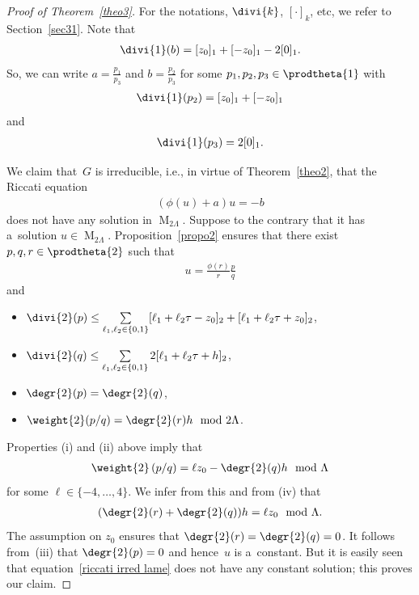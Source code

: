 \documentclass[pdftex]{sigma}
\numberwithin{equation}{section}
\begin{document}
\begin{proof}[Proof of Theorem~\ref{theo3}] For the notations, $\divi{k}$, $[\cdot]_k$, etc, we refer to Section~\ref{sec31}.
Note that
\begin{gather*}
\divi{1} (b)=[z_{0}]_{1}+[-z_{0}]_{1}-2[0]_{1}.
\end{gather*}
So, we can write $a=\frac{p_{1}}{p_{3}}$ and $b=\frac{p_{2}}{p_{3}}$ for some $p_{1},p_{2},p_{3}\in \prodtheta{1}$ with
\begin{gather*}
\divi{1} (p_{2})=[z_{0}]_{1}+[-z_{0}]_{1}
\end{gather*}
and
\begin{gather*}
\divi{1} (p_{3})=2[0]_{1}.
\end{gather*}

We claim that~$G$ is irreducible, i.e., in virtue of Theorem~\ref{theo2}, that the Riccati equation
\begin{gather}
\label{riccati irred lame}
(\phi(u)+a)u=-b
\end{gather}
does not have any solution in $\operatorname{M}_{2\Lambda}$.
Suppose to the contrary that it has a~solution $u \in \operatorname{M}_{2\Lambda}$.
Proposition~\ref{propo2} ensures that there exist $p,q, r\in \prodtheta{2}$ such that
\begin{gather*}
u= \frac{\phi(r)}{r}\frac{p}{q}
\end{gather*}
and
\begin{itemize}
\itemsep=0pt
\item[(i)] $\divi{2} (p) \leq \sum\limits_{\ell_{1},\ell_{2} \in
\{0,1\}}[\ell_{1}+\ell_{2}\tau-z_{0}]_{2}+[\ell_{1}+\ell_{2}\tau+z_{0}]_{2}$,
\item[(ii)] $\divi{2} (q) \leq \sum\limits_{\ell_{1},\ell_{2} \in \{0,1\}}2[\ell_{1}+\ell_{2}\tau+h]_{2}$,
\item[(iii)] $\degr{2} (p)=\degr{2} (q)$,
\item[(iv)] $\weight{2} (p/q)=\degr{2} (r) h \mod 2\Lambda$.
\end{itemize}
Properties (i) and (ii) above imply that
\begin{gather*}
\weight{2} \left(p/q\right) = \ell z_{0}-\degr{2} (q)h \mod \Lambda
\end{gather*}
for some $\ell \in \{-4,\dots,4\}$.
We infer from this and from (iv) that
\begin{gather*}
(\degr{2} (r) + \degr{2} (q))h = \ell z_{0} \mod \Lambda.
\end{gather*}
The assumption on $z_{0}$ ensures that $\degr{2} (r) = \degr{2} (q)=0$.
It follows from~(iii) that $ \degr{2} (p)=0$ and hence~$u$ is a~constant.
But it is easily seen that equation~\eqref{riccati irred lame} does not have any constant solution; this proves our
claim.


\end{proof}
\end{document}
